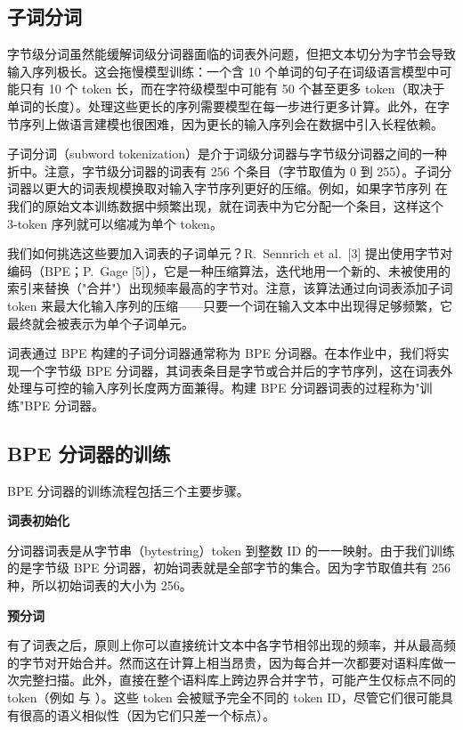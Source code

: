 \subsection{子词分词}

字节级分词虽然能缓解词级分词器面临的词表外问题，但把文本切分为字节会导致输入序列极长。这会拖慢模型训练：一个含 10 个单词的句子在词级语言模型中可能只有 10 个 token 长，而在字符级模型中可能有 50 个甚至更多 token（取决于单词的长度）。处理这些更长的序列需要模型在每一步进行更多计算。此外，在字节序列上做语言建模也很困难，因为更长的输入序列会在数据中引入长程依赖。

子词分词（subword tokenization）是介于词级分词器与字节级分词器之间的一种折中。注意，字节级分词器的词表有 256 个条目（字节取值为 0 到 255）。子词分词器以更大的词表规模换取对输入字节序列更好的压缩。例如，如果字节序列  在我们的原始文本训练数据中频繁出现，就在词表中为它分配一个条目，这样这个 3-token 序列就可以缩减为单个 token。

我们如何挑选这些要加入词表的子词单元？R.~Sennrich et al.~[3] 提出使用字节对编码（BPE；P.~Gage [5]），它是一种压缩算法，迭代地用一个新的、未被使用的索引来替换（"合并"）出现频率最高的字节对。注意，该算法通过向词表添加子词 token 来最大化输入序列的压缩——只要一个词在输入文本中出现得足够频繁，它最终就会被表示为单个子词单元。

词表通过 BPE 构建的子词分词器通常称为 BPE 分词器。在本作业中，我们将实现一个字节级 BPE 分词器，其词表条目是字节或合并后的字节序列，这在词表外处理与可控的输入序列长度两方面兼得。构建 BPE 分词器词表的过程称为"训练"BPE 分词器。

\subsection{BPE 分词器的训练}

BPE 分词器的训练流程包括三个主要步骤。

\textbf{词表初始化}

分词器词表是从字节串（bytestring）token 到整数 ID 的一一映射。由于我们训练的是字节级 BPE 分词器，初始词表就是全部字节的集合。因为字节取值共有 256 种，所以初始词表的大小为 256。

\textbf{预分词}

有了词表之后，原则上你可以直接统计文本中各字节相邻出现的频率，并从最高频的字节对开始合并。然而这在计算上相当昂贵，因为每合并一次都要对语料库做一次完整扫描。此外，直接在整个语料库上跨边界合并字节，可能产生仅标点不同的 token（例如  与 ）。这些 token 会被赋予完全不同的 token ID，尽管它们很可能具有很高的语义相似性（因为它们只差一个标点）。

